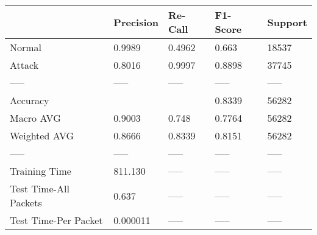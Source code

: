 \begin{tabular}{lllll}
\toprule
{} & Precision & Re-Call & F1-Score & Support \\
\midrule
Normal                &    0.9989 &  0.4962 &    0.663 &   18537 \\
Attack                &    0.8016 &  0.9997 &   0.8898 &   37745 \\
-----                 &     ----- &   ----- &    ----- &   ----- \\
Accuracy              &           &         &   0.8339 &   56282 \\
Macro AVG             &    0.9003 &   0.748 &   0.7764 &   56282 \\
Weighted AVG          &    0.8666 &  0.8339 &   0.8151 &   56282 \\
-----                 &     ----- &   ----- &    ----- &   ----- \\
Training Time         &   811.130 &   ----- &    ----- &   ----- \\
Test Time-All Packets &     0.637 &   ----- &    ----- &   ----- \\
Test Time-Per Packet  &  0.000011 &   ----- &    ----- &   ----- \\
\bottomrule
\end{tabular}
